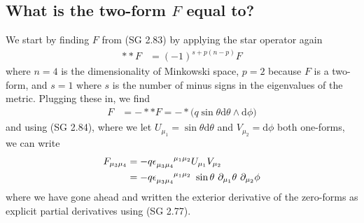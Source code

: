 \subsection{What is the two-form $F$ equal to?}

We start by finding $F$ from (SG 2.83) by applying the star operator again
%
\begin{align}
\ast \ast F &= (-1)^{s + p\left(n-p\right)} F
\end{align} 
%
where $n = 4$ is the dimensionality of Minkowski space, $p=2$ because $F$ is a two-form, and $s=1$ where $s$ is the number of minus signs in the eigenvalues of the metric. Plugging these in, we find  
%
\begin{align}
F &= - \ast \ast F = - \ast \big( q \sin{\theta}  \textrm{d} \theta  \wedge  \textrm{d} \phi \big)
\end{align} 
%
and using (SG 2.84), where we let $U_{\mu_1} = \sin{\theta}  \textrm{d} \theta$ and $V_{\mu_2} =  \textrm{d} \phi$ both one-forms, we can write 
%
\begin{align}
F_{\mu_3 \mu_4} &= - q \epsilon\indices{_{\mu_3 \mu_4}^{\mu_1 \mu_2}} U_{\mu_1} V_{\mu_2} \notag \\
&= - q \epsilon\indices{_{\mu_3 \mu_4}^{\mu_1 \mu_2}} \ \sin{\theta} \ \partial_{\mu_1} \theta \ \partial_{\mu_2} \phi
\end{align} 
%
where we have gone ahead and written the exterior derivative of the zero-forms as explicit partial derivatives using (SG 2.77).

